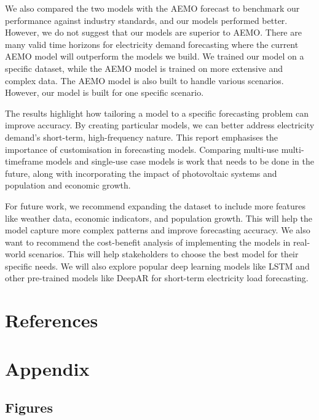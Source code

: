 \documentclass[mstat,12pt]{unswthesis}
\begin{document}
We also compared the two models with the AEMO forecast to benchmark our
performance against industry standards, and our models performed better.
However, we do not suggest that our models are superior to AEMO. There
are many valid time horizons for electricity demand forecasting where
the current AEMO model will outperform the models we build. We trained
our model on a specific dataset, while the AEMO model is trained on more
extensive and complex data. The AEMO model is also built to handle
various scenarios. However, our model is built for one specific
scenario.

The results highlight how tailoring a model to a specific forecasting
problem can improve accuracy. By creating particular models, we can
better address electricity demand's short-term, high-frequency nature.
This report emphasises the importance of customisation in forecasting
models. Comparing multi-use multi-timeframe models and single-use case
models is work that needs to be done in the future, along with
incorporating the impact of photovoltaic systems and population and
economic growth.

For future work, we recommend expanding the dataset to include more
features like weather data, economic indicators, and population growth.
This will help the model capture more complex patterns and improve
forecasting accuracy. We also want to recommend the cost-benefit
analysis of implementing the models in real-world scenarios. This will
help stakeholders to choose the best model for their specific needs. We
will also explore popular deep learning models like LSTM and other
pre-trained models like DeepAR for short-term electricity load
forecasting.

\chapter*{References}\label{references}

 


\chapter*{Appendix}\label{appendix}

\section*{\texorpdfstring{\textbf{Figures}}{Figures}}\label{figures}
\end{document}
